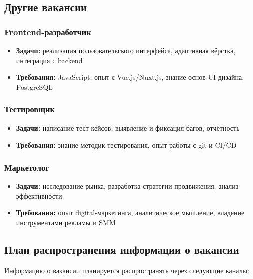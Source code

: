 \documentclass[14pt, russian]{matmex-diploma-custom}
\begin{document}
    \subsection{Другие вакансии}

    \subsubsection{Frontend-разработчик}
    \begin{itemize}
      \item \textbf{Задачи:} реализация пользовательского интерфейса, адаптивная вёрстка, интеграция с backend
      \item \textbf{Требования:} JavaScript, опыт с Vue.js/Nuxt.js, знание основ UI-дизайна, PostgreSQL
    \end{itemize}

    \subsubsection{Тестировщик}
    \begin{itemize}
      \item \textbf{Задачи:} написание тест-кейсов, выявление и фиксация багов, отчётность
      \item \textbf{Требования:} знание методик тестирования, опыт работы с git и CI/CD
    \end{itemize}

    \subsubsection{Маркетолог}
    \begin{itemize}
      \item \textbf{Задачи:} исследование рынка, разработка стратегии продвижения, анализ эффективности
      \item \textbf{Требования:} опыт digital-маркетинга, аналитическое мышление, владение инструментами рекламы и SMM
    \end{itemize}

    \subsection{План распространения информации о вакансии}

    Информацию о вакансии планируется распространять через следующие каналы:
\end{document}
